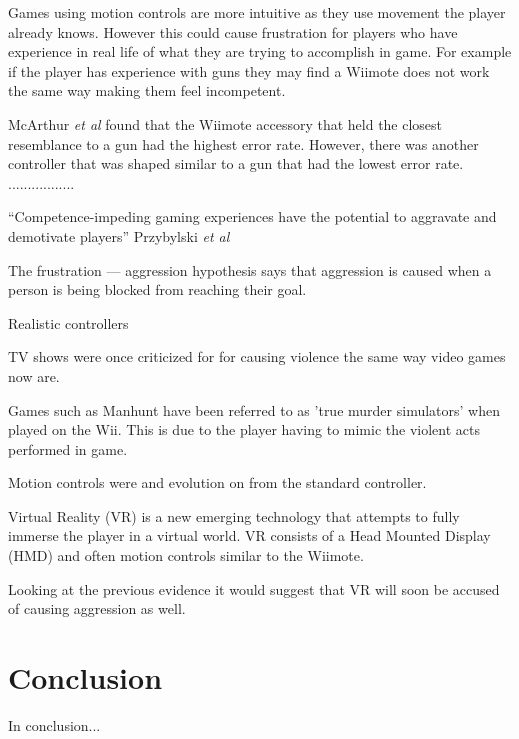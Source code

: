 \documentclass{scrartcl}
\begin{document}
Games using motion controls are more intuitive as they use movement the player already knows. \cite{Kim} However this could cause frustration for players who have experience in real life of what they are trying to accomplish in game. For example if the player has experience with guns they may find a Wiimote does not work the same way making them feel incompetent. 

McArthur \textit{et al}  found that the Wiimote accessory that held the closest resemblance to a gun had the highest error rate. However, there was another controller that was shaped similar to a gun that had the lowest error rate. \cite{McArthur} .................
 
 
\bigskip
“Competence-impeding gaming experiences have the potential to aggravate and demotivate players”  Przybylski \textit{et al} \cite{przybylski}


The frustration --- aggression hypothesis says that aggression is caused when a person is being blocked from reaching their goal. \cite{dollard1939frustration}  


Realistic controllers \cite{McGloin}


 
\bigskip
TV shows were once criticized for for causing violence the same way video games now are. \cite{Sherry} 

Games such as Manhunt have been referred to as 'true murder simulators' when played on the Wii. \cite{Manhunt} This is due to the player having to mimic the violent acts performed in game.

Motion controls were and evolution on from the standard controller.

Virtual Reality (VR) is a new emerging technology that attempts to fully immerse the player in a virtual world. VR consists of a Head Mounted Display (HMD) and often motion controls similar to the Wiimote.

Looking at the previous evidence it would suggest that VR will soon be accused of causing aggression as well. 

\section{Conclusion}
In conclusion...

	


	
\end{document}
